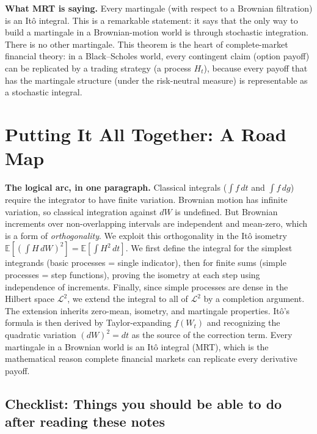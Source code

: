 \documentclass[11pt,a4paper]{article}
\theoremstyle{definition}
\theoremstyle{plain}
\theoremstyle{remark}
\newcommand{\E}{\mathbb{E}}
\newcommand{\calL}{\mathcal{L}}
\begin{document}
\begin{tutobox}
\textbf{What MRT is saying.}
Every martingale (with respect to a Brownian filtration) is an Itô integral. This is a remarkable statement: it says that the only way to build a martingale in a Brownian-motion world is through stochastic integration. There is no other martingale. This theorem is the heart of complete-market financial theory: in a Black--Scholes world, every contingent claim (option payoff) can be replicated by a trading strategy (a process $H_t$), because every payoff that has the martingale structure (under the risk-neutral measure) is representable as a stochastic integral.
\end{tutobox}

\section{Putting It All Together: A Road Map}
\label{sec:roadmap}

\begin{tutobox}
\textbf{The logical arc, in one paragraph.}
Classical integrals ($\int f\,dt$ and $\int f\,dg$) require the integrator to have finite variation. Brownian motion has infinite variation, so classical integration against $dW$ is undefined. But Brownian increments over non-overlapping intervals are independent and mean-zero, which is a form of \emph{orthogonality}. We exploit this orthogonality in the Itô isometry $\E[(\int H\,dW)^2] = \E[\int H^2\,dt]$. We first define the integral for the simplest integrands (basic processes = single indicator), then for finite sums (simple processes = step functions), proving the isometry at each step using independence of increments. Finally, since simple processes are dense in the Hilbert space $\calL^2$, we extend the integral to all of $\calL^2$ by a completion argument. The extension inherits zero-mean, isometry, and martingale properties. Itô's formula is then derived by Taylor-expanding $f(W_t)$ and recognizing the quadratic variation $(dW)^2 = dt$ as the source of the correction term. Every martingale in a Brownian world is an Itô integral (MRT), which is the mathematical reason complete financial markets can replicate every derivative payoff.
\end{tutobox}

\subsection*{Checklist: Things you should be able to do after reading these notes}
\end{document}

